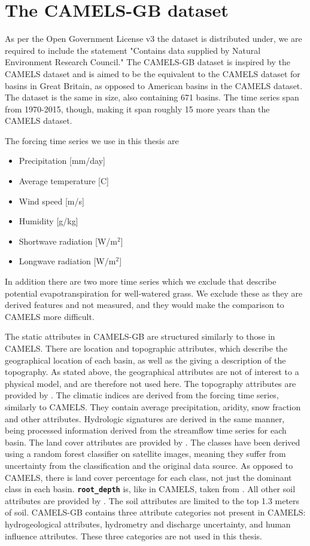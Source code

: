 \section{The CAMELS-GB dataset}
As per the Open Government License v3 the dataset is distributed under, we are required 
to include the statement "Contains data supplied by Natural Environment Research Council."
The CAMELS-GB dataset \citep{CAMELS_GB} is inspired by the CAMELS dataset and is 
aimed to be the equivalent to the CAMELS dataset for basins in Great Britain, 
as opposed to American basins in the CAMELS dataset. The dataset is the same in size,
also containing 671 basins. The time series span from 1970-2015, though, making 
it span roughly 15 more years than the CAMELS dataset.

The forcing time series we use in this thesis are
\begin{itemize}
    \item Precipitation [mm/day]
    \item Average temperature [C\degree]
    \item Wind speed [m/s]
    \item Humidity [g/kg]
    \item Shortwave radiation [W/m$^2$]
    \item Longwave radiation [W/m$^2$]
\end{itemize}
In addition there are two more time series which we exclude that describe potential 
evapotranspiration for well-watered grass. We exclude these as they are derived 
features and not measured, and they would make the comparison to CAMELS more difficult.

The static attributes in CAMELS-GB are structured similarly to those in CAMELS. 
There are location and topographic attributes, which describe the geographical 
location of each basin, as well as the giving a description of the topography. 
As stated above, the geographical attributes are not of interest to a physical model, 
and are therefore not used here. The topography attributes are provided by 
\citet{morris1990digital}.
The climatic indices are derived from the forcing time series, similarly to CAMELS. 
They contain average precipitation, aridity, snow fraction and other attributes.
Hydrologic signatures are derived in the same manner, being processed information 
derived from the streamflow time series for each basin. 
The land cover attributes are provided by \citet{rowland2017land}. The classes 
have been derived using a random forest classifier on satellite images, meaning 
they suffer from uncertainty from the classification and the original data source. 
As opposed to CAMELS, there is land cover percentage for each class, not just the 
dominant class in each basin.
\textbf{\texttt{root\_depth}} is, like in CAMELS, taken from \citet{pelletier}. 
All other soil attributes are provided by \citet{hiederer2013mappinga, hiederer2013mappingb}.
The soil attributes are limited to the top 1.3 meters of soil. CAMELS-GB 
contains three attribute categories not present in CAMELS: hydrogeological attributes, 
hydrometry and discharge uncertainty, and human influence attributes. These three 
categories are not used in this thesis.

